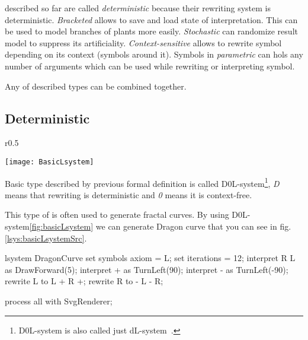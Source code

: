 \lsystems described so far are called \emph{deterministic \lsystems} because their rewriting system is deterministic.
\emph{Bracketed \lsystems} allows to save and load state of interpretation.
This can be used to model branches of plants more easily.
\emph{Stochastic \lsystems} can randomize result model to suppress its artificiality.
\emph{Context-sensitive \lsystems} allows to rewrite symbol depending on its context (symbols around it).
Symbols in \emph{parametric \lsystems} can hols any number of arguments which can be used while rewriting or interpreting symbol.

Any of described types can be combined together.



\subsection{Deterministic \lsystems}

\newcommand{\dzerolsystem}{\mbox{D0L-system}\xspace}
\newcommand{\dlsystem}{\mbox{dL-system}\xspace}


\begin{wrapfigure}{r}{0.5\textwidth}
	\vspace{-40pt}
	\begin{center}
	\texttt{[image: BasicLsystem]}
	\end{center}
	\caption{Dragon curve}
	\label{fig:basicLsystem}
\end{wrapfigure}


Basic \lsystem type described by previous formal definition is called \dzerolsystem{}\footnote{\dzerolsystem is also called just \dlsystem~\cite{Zar04}.}, \emph{D} means that rewriting is deterministic and \emph{0} means it is context-free.

This type of \lsystem is often used to generate fractal curves.
By using \dzerolsystem \ref{fig:basicLsystem} we can generate Dragon curve that you can see in fig. \ref{lsys:basicLsystemSrc}.

\begin{Lsystem}[label=lsys:basicLsystemSrc,caption={Basic \dzerolsystem for generation of Dragon curve (fig. \ref{fig:basicLsystem})}]
lsystem DragonCurve {
	set symbols axiom = L;
	set iterations = 12;
	interpret R L as DrawForward(5);
	interpret + as TurnLeft(90);
	interpret - as TurnLeft(-90);
	rewrite L to L + R +;
	rewrite R to - L - R;
}

process all with SvgRenderer;
\end{Lsystem}


